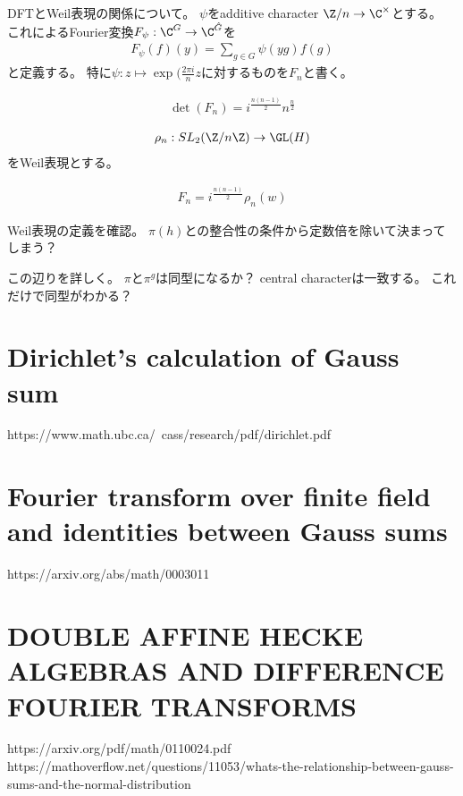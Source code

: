 \documentclass{jsarticle}
\begin{document}
DFTとWeil表現の関係について。
$\psi$をadditive character $\Z/n \to \C^\times$とする。
これによるFourier変換$F_\psi:\C^G\to\C^{\hat{G}}$を
\begin{align*}
F_\psi(f)(y)=\sum_{g\in G}\psi(yg)f(g)
\end{align*}
と定義する。
特に$\psi:z\mapsto\exp(\frac{2\pi i}{n}z$に対するものを$F_n$と書く。
\begin{prop}
\begin{align*}
\det(F_n)=i^{\frac{n(n-1)}{2}}n^{\frac{n}{2}}
\end{align*}
\end{prop}

\begin{align*}
\rho_n:SL_2(\Z/n\Z)\to \GL(H)
\end{align*}
をWeil表現とする。
\begin{lem}
\begin{align*}
F_n=i^{\frac{n(n-1)}{2}}\rho_n(w)
\end{align*}
\end{lem}
Weil表現の定義を確認。
$\pi(h)$との整合性の条件から定数倍を除いて決まってしまう？

この辺りを詳しく。
$\pi$と$\pi^g$は同型になるか？
central characterは一致する。
これだけで同型がわかる？


\section{Dirichlet's calculation of Gauss sum}
https://www.math.ubc.ca/~cass/research/pdf/dirichlet.pdf

\section{Fourier transform over finite field and identities between Gauss sums}
https://arxiv.org/abs/math/0003011

\section{DOUBLE AFFINE HECKE ALGEBRAS AND DIFFERENCE FOURIER TRANSFORMS}
https://arxiv.org/pdf/math/0110024.pdf
https://mathoverflow.net/questions/11053/whats-the-relationship-between-gauss-sums-and-the-normal-distribution
\end{document}

